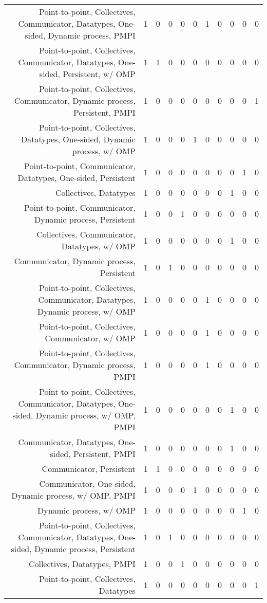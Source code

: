 {\begin{landscape}
\begin{longtable}[htb]{r|c|c|c|c|c|c|c|c|c|c}
{Point-to-point, Collectives, Communicator, Datatypes, One-sided, Dynamic process, PMPI} & 1 & 0 & 0 & 0 & 0 & 1 & 0 & 0 & 0 & 0 \\%
{Point-to-point, Collectives, Communicator, Datatypes, One-sided, Persistent, w/ OMP} & 1 & 1 & 0 & 0 & 0 & 0 & 0 & 0 & 0 & 0 \\%
{Point-to-point, Collectives, Communicator, Dynamic process, Persistent, PMPI} & 1 & 0 & 0 & 0 & 0 & 0 & 0 & 0 & 0 & 1 \\%
{Point-to-point, Collectives, Datatypes, One-sided, Dynamic process, w/ OMP} & 1 & 0 & 0 & 0 & 1 & 0 & 0 & 0 & 0 & 0 \\%
{Point-to-point, Communicator, Datatypes, One-sided, Persistent} & 1 & 0 & 0 & 0 & 0 & 0 & 0 & 0 & 1 & 0 \\%
{Collectives, Datatypes} & 1 & 0 & 0 & 0 & 0 & 0 & 0 & 1 & 0 & 0 \\%
{Point-to-point, Communicator, Dynamic process, Persistent} & 1 & 0 & 0 & 1 & 0 & 0 & 0 & 0 & 0 & 0 \\%
{Collectives, Communicator, Datatypes, w/ OMP} & 1 & 0 & 0 & 0 & 0 & 0 & 0 & 1 & 0 & 0 \\%
{Communicator, Dynamic process, Persistent} & 1 & 0 & 1 & 0 & 0 & 0 & 0 & 0 & 0 & 0 \\%
{Point-to-point, Collectives, Communicator, Datatypes, Dynamic process, w/ OMP} & 1 & 0 & 0 & 0 & 0 & 1 & 0 & 0 & 0 & 0 \\%
{Point-to-point, Collectives, Communicator, w/ OMP} & 1 & 0 & 0 & 0 & 0 & 1 & 0 & 0 & 0 & 0 \\%
{Point-to-point, Collectives, Communicator, Dynamic process, PMPI} & 1 & 0 & 0 & 0 & 0 & 1 & 0 & 0 & 0 & 0 \\%
{Point-to-point, Collectives, Communicator, Datatypes, One-sided, Dynamic process, w/ OMP, PMPI} & 1 & 0 & 0 & 0 & 0 & 0 & 0 & 1 & 0 & 0 \\%
{Communicator, Datatypes, One-sided, Persistent, PMPI} & 1 & 0 & 0 & 0 & 0 & 0 & 0 & 1 & 0 & 0 \\%
{Communicator, Persistent} & 1 & 1 & 0 & 0 & 0 & 0 & 0 & 0 & 0 & 0 \\%
{Communicator, One-sided, Dynamic process, w/ OMP, PMPI} & 1 & 0 & 0 & 0 & 1 & 0 & 0 & 0 & 0 & 0 \\%
{Dynamic process, w/ OMP} & 1 & 0 & 0 & 0 & 0 & 0 & 0 & 0 & 1 & 0 \\%
{Point-to-point, Collectives, Communicator, Datatypes, One-sided, Dynamic process, Persistent} & 1 & 0 & 1 & 0 & 0 & 0 & 0 & 0 & 0 & 0 \\%
{Collectives, Datatypes, PMPI} & 1 & 0 & 0 & 1 & 0 & 0 & 0 & 0 & 0 & 0 \\%
{Point-to-point, Collectives, Datatypes} & 1 & 0 & 0 & 0 & 0 & 0 & 0 & 0 & 0 & 1 \\%
\hline%
\end{longtable}%
\end{landscape}}%
\clearpage%
